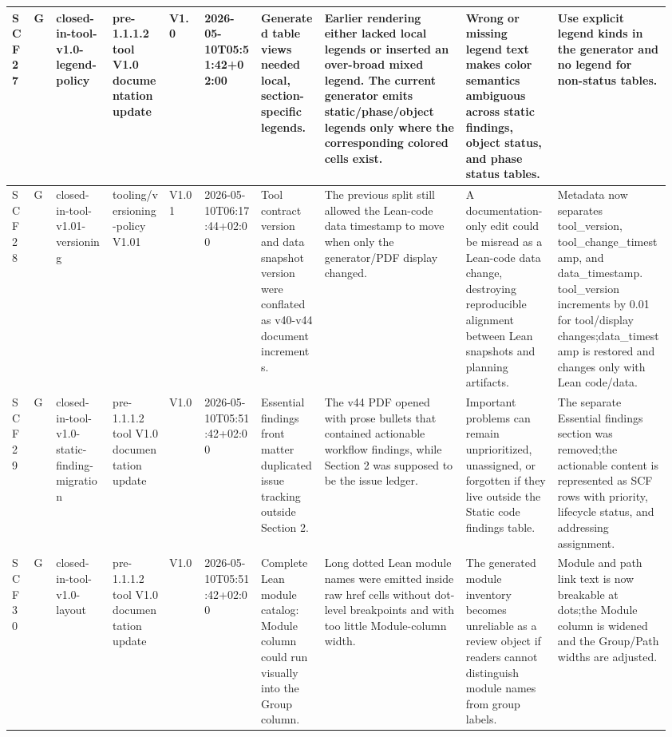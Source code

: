 \begin{longtable}{L{0.03\linewidth} L{0.026\linewidth} L{0.087\linewidth} L{0.085\linewidth} L{0.052\linewidth} L{0.085\linewidth} L{0.095\linewidth} L{0.205\linewidth} L{0.13\linewidth} L{0.165\linewidth}}
\hline
\addlinespace[0.24em]
SCF27 & G & closed-in-tool-v1.0-legend-policy & pre-1.1.1.2 tool V1.0 documentation update & V1.0 & 2026-05-10T05:51:42+02:00 & Generated table views needed local, section-specific legends. & Earlier rendering either lacked local legends or inserted an over-broad mixed legend. The current generator emits static/\allowbreak{}phase/\allowbreak{}object legends only where the corresponding colored cells exist. & Wrong or missing legend text makes color semantics ambiguous across static findings, object status, and phase status tables. & Use explicit legend kinds in the generator and no legend for non-status tables.\\
\hline
\addlinespace[0.24em]
SCF28 & G & closed-in-tool-v1.01-versioning & tooling/\allowbreak{}versioning-policy V1.01 & V1.01 & 2026-05-10T06:17:44+02:00 & Tool contract version and data snapshot version were conflated as v40-v44 document increments. & The previous split still allowed the Lean-code data timestamp to move when only the generator/\allowbreak{}PDF display changed. & A documentation-only edit could be misread as a Lean-code data change, destroying reproducible alignment between Lean snapshots and planning artifacts. & Metadata now separates tool\_version, tool\_change\_timestamp, and data\_timestamp. tool\_version increments by 0.01 for tool/\allowbreak{}display changes;\newline data\_timestamp is restored and changes only with Lean code/\allowbreak{}data.\\
\hline
\addlinespace[0.24em]
SCF29 & G & closed-in-tool-v1.0-static-finding-migration & pre-1.1.1.2 tool V1.0 documentation update & V1.0 & 2026-05-10T05:51:42+02:00 & Essential findings front matter duplicated issue tracking outside Section 2. & The v44 PDF opened with prose bullets that contained actionable workflow findings, while Section 2 was supposed to be the issue ledger. & Important problems can remain unprioritized, unassigned, or forgotten if they live outside the Static code findings table. & The separate Essential findings section was removed;\newline the actionable content is represented as SCF rows with priority, lifecycle status, and addressing assignment.\\
\hline
\addlinespace[0.24em]
SCF30 & G & closed-in-tool-v1.0-layout & pre-1.1.1.2 tool V1.0 documentation update & V1.0 & 2026-05-10T05:51:42+02:00 & Complete Lean module catalog: Module column could run visually into the Group column. & Long dotted Lean module names were emitted inside raw href cells without dot-level breakpoints and with too little Module-column width. & The generated module inventory becomes unreliable as a review object if readers cannot distinguish module names from group labels. & Module and path link text is now breakable at dots;\newline the Module column is widened and the Group/\allowbreak{}Path widths are adjusted.\\

\end{longtable}
